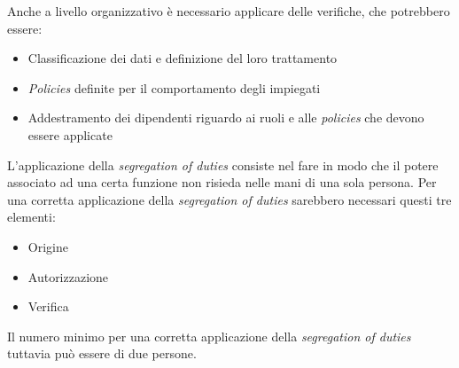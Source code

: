 \begin{Answer} [
  ref={fr7},
  number={7}
 ]
Anche a livello organizzativo è necessario applicare delle verifiche, che
potrebbero essere:
\begin{itemize}
  \item Classificazione dei dati e definizione del loro trattamento
  \item \textit{Policies} definite per il comportamento degli impiegati
  \item Addestramento dei dipendenti riguardo ai ruoli e alle \textit{policies}
che devono essere applicate
\end{itemize}


 \Question L'applicazione della \textit{segregation of duties} consiste nel 
fare in modo che il potere associato ad una certa funzione non risieda nelle 
mani di una sola persona. Per una corretta applicazione della 
\textit{segregation of duties} sarebbero necessari questi tre elementi:
\begin{itemize}
 \item Origine
 \item Autorizzazione
 \item Verifica
\end{itemize}

Il numero minimo per una corretta applicazione della \textit{segregation of 
duties} tuttavia pu\`o essere di due persone.

\end{Answer}

